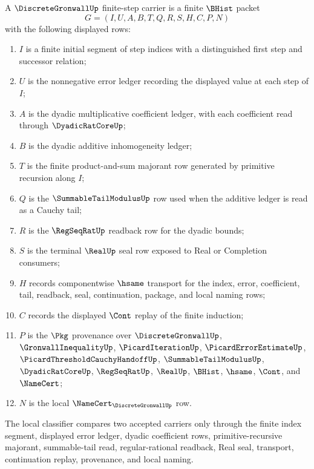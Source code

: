 \begin{definition}
\label{def:discrete-gronwall-finite-step-carrier}
A $\DiscreteGronwallUp$ finite-step carrier is a finite $\BHist$ packet
$$
G=(I,U,A,B,T,Q,R,S,H,C,P,N)
$$
with the following displayed rows:
\begin{enumerate}
\item $I$ is a finite initial segment of step indices with a distinguished first step and successor relation;
\item $U$ is the nonnegative error ledger recording the displayed value at each step of $I$;
\item $A$ is the dyadic multiplicative coefficient ledger, with each coefficient read through $\DyadicRatCoreUp$;
\item $B$ is the dyadic additive inhomogeneity ledger;
\item $T$ is the finite product-and-sum majorant row generated by primitive recursion along $I$;
\item $Q$ is the $\SummableTailModulusUp$ row used when the additive ledger is read as a Cauchy tail;
\item $R$ is the $\RegSeqRatUp$ readback row for the dyadic bounds;
\item $S$ is the terminal $\RealUp$ seal row exposed to Real or Completion consumers;
\item $H$ records componentwise $\hsame$ transport for the index, error, coefficient, tail, readback, seal, continuation, package, and local naming rows;
\item $C$ records the displayed $\Cont$ replay of the finite induction;
\item $P$ is the $\Pkg$ provenance over $\DiscreteGronwallUp$, $\GronwallInequalityUp$, $\PicardIterationUp$, $\PicardErrorEstimateUp$, $\PicardThresholdCauchyHandoffUp$, $\SummableTailModulusUp$, $\DyadicRatCoreUp$, $\RegSeqRatUp$, $\RealUp$, $\BHist$, $\hsame$, $\Cont$, and $\NameCert$;
\item $N$ is the local $\NameCert_{\DiscreteGronwallUp}$ row.
\end{enumerate}
The local classifier compares two accepted carriers only through the finite index segment, displayed error ledger, dyadic coefficient rows, primitive-recursive majorant, summable-tail read, regular-rational readback, Real seal, transport, continuation replay, provenance, and local naming.
\end{definition}

